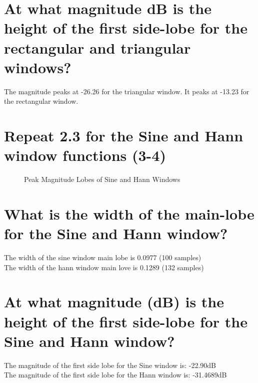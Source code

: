 \documentclass[titlepage]{scrartcl}
\begin{document}
\section{At what magnitude dB is the height of the first side-lobe for the
rectangular and triangular windows?}
The magnitude peaks at -26.26 for the triangular window. It peaks at -13.23 for
the rectangular window.

\section{Repeat 2.3 for the Sine and Hann window functions (3-4)}
\begin{figure}[H]
    \caption{Peak Magnitude Lobes of Sine and Hann Windows}
    \label{SineHannDFT}
\end{figure}

\section{What is the width of the main-lobe for the Sine and Hann window?}
The width of the sine window main lobe is 0.0977 (100 samples)\\
The width of the hann window main love is 0.1289 (132 samples)

\section{At what magnitude (dB) is the height of the first side-lobe for the
Sine and
Hann window?}
The magnitude of the first side lobe for the Sine window is: -22.90dB\\
The magnitude of the first side lobe for the Hann window is: -31.4689dB
\end{document}
